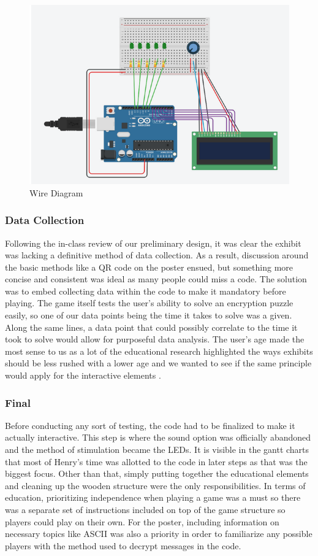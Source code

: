 \documentclass[conference]{IEEEtran}
\begin{document}
\begin{figure}[H]
  \centering
  \includegraphics[width=.45\textwidth]{Figures/WireDiagram1.png}
  \caption{Wire Diagram}
\end{figure}

\subsubsection{Data Collection}

\par Following the in-class review of our preliminary design, it was clear the exhibit was lacking a definitive method of data collection. As a result, discussion around the basic methods like a QR code on the poster ensued, but something more concise and consistent was ideal as many people could miss a code. The solution was to embed collecting data within the code to make it mandatory before playing. The game itself tests the user’s ability to solve an encryption puzzle easily, so one of our data points being the time it takes to solve was a given. Along the same lines, a data point that could possibly correlate to the time it took to solve would allow for purposeful data analysis. The user’s age made the most sense to us as a lot of the educational research highlighted the ways exhibits should be less rushed with a lower age and we wanted to see if the same principle would apply for the interactive elements \cite{b16}. 

\subsubsection{Final}

\par Before conducting any sort of testing, the code had to be finalized to make it actually interactive. This step is where the sound option was officially abandoned and the method of stimulation became the LEDs. It is visible in the gantt charts that most of Henry’s time was allotted to the code in later steps as that was the biggest focus. Other than that, simply putting together the educational elements and cleaning up the wooden structure were the only responsibilities. In terms of education, prioritizing independence when playing a game was a must so there was a separate set of instructions included on top of the game structure so players could play on their own. For the poster, including information on necessary topics like ASCII was also a priority in order to familiarize any possible players with the method used to decrypt messages in the code.  
\end{document}
